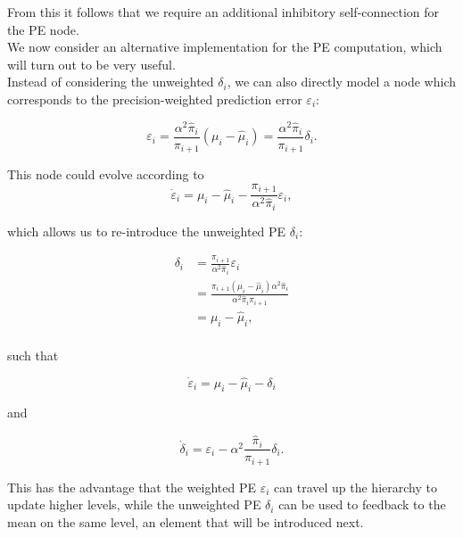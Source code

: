 From this it follows that we require an additional inhibitory self-connection for the \textsf{PE} node.\\

We now consider an alternative implementation for the \textsf{PE} computation, which will turn out to be very useful.\\

Instead of considering the unweighted $\delta_i$, we can also directly model a node which corresponds to the precision-weighted prediction error $\varepsilon_i$:

\begin{equation}
	\varepsilon_i = \frac{\alpha^2 \hat{\pi}_i}{\pi_{i+1}} (\mu_i - \hat{\mu}_i) = \frac{\alpha^2 \hat{\pi}_i}{\pi_{i+1}} \delta_i.
\end{equation}

This node could evolve according to
\begin{equation}
	\dot{\varepsilon}_i = \mu_i - \hat{\mu}_i -  \frac{\pi_{i+1}}{\alpha^2 \hat{\pi}_i} \varepsilon_i,
\end{equation}

which allows us to re-introduce the unweighted \textsf{PE} $\delta_i$:

\begin{equation}
	\begin{split}
		\delta_i &= \frac{\pi_{i+1}}{\alpha^2 \hat{\pi}_i} \varepsilon_i \\
		&= \frac{\pi_{i+1} (\mu_i - \hat{\mu}_i) \alpha^2 \hat{\pi}_i}{\alpha^2 \hat{\pi}_i \pi_{i+1}}\\
		&= \mu_i - \hat{\mu}_i,\\
	\end{split}
\end{equation}

such that

\begin{equation}
	\dot{\varepsilon}_i = \mu_i - \hat{\mu}_i - \delta_i
\end{equation}

and

\begin{equation}
	\dot{\delta}_i = \varepsilon_i - \alpha^2 \frac{\hat{\pi}_i}{\pi_{i+1}} \delta_i.
\end{equation}

This has the advantage that the weighted \textsf{PE} $\varepsilon_i$ can travel up the hierarchy to update higher levels, while the unweighted \textsf{PE} $\delta_i$ can be used to feedback to the mean on the same level, an element that will be introduced next.\\ 

